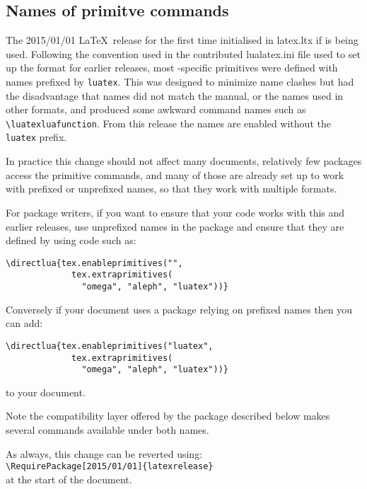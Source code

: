 \documentclass{ltnews}
\begin{document}
\subsection{Names of  primitve commands}

The 2015/01/01 \LaTeX\ release for the first time initialised
 in \textsf{latex.ltx} if  is being
used. Following the convention used in the contributed
\textsf{lualatex.ini} file used to set up the format for earlier
releases, most -specific primitives were defined with
names prefixed by \texttt{luatex}. This was designed to minimize name
clashes but had the disadvantage that names did not match the
 manual, or the names used in other formats, and
produced some awkward command names such as \verb|\luatexluafunction|.
From this release the names are enabled without the \texttt{luatex}
prefix.

In practice this change should not affect many documents, relatively
few packages access the primitive commands, and many of those are
already set up to work with prefixed or unprefixed names, so that they
work with multiple formats.

For package writers, if you want to ensure that your code works with
this and earlier releases, use unprefixed names in the package and
ensure that they are defined by using code such as:
\begin{verbatim}
\directlua{tex.enableprimitives("",
             tex.extraprimitives(
               "omega", "aleph", "luatex"))}
\end{verbatim}
Conversely if your document  uses a package relying on prefixed names
then you can add:
\begin{verbatim}
\directlua{tex.enableprimitives("luatex",
             tex.extraprimitives(
               "omega", "aleph", "luatex"))}
\end{verbatim}
to your document.

Note the compatibility layer offered by the  package
described below makes several commands available under both names.

As always, this change can be reverted using:\\
\verb|\RequirePackage[2015/01/01]{latexrelease}|\\
at the start of the document.
\end{document}
